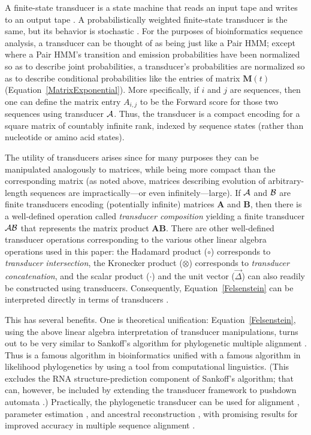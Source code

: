 \documentclass{bmcart}
\newcommand{\matr}[1]{\mathbf{#1}}
\newcommand{\trans}[1]{{\cal #1}}
\newcommand{\eqref}[1]{Equation~\ref{#1}}
\newcommand{\condmatrix}{\matr{M}}
\newcommand{\unitvec}{\vec{\Delta}}
\newcommand{\pointprod}{\circ}
\newcommand{\scalarprod}{\cdot}
\begin{document}
A finite-state transducer is a state machine that reads an input tape and writes to an output tape \cite{Mealy55}.
A probabilistically weighted finite-state transducer is the same, but its behavior is stochastic \cite{MohriPereiraRiley2000}.
For the purposes of bioinformatics sequence analysis,
a transducer can be thought of as being just like a Pair HMM;
except where a Pair HMM's transition and emission probabilities
have been normalized so as to describe joint probabilities,
a transducer's probabilities are normalized so as to describe conditional probabilities
like the entries of matrix $\condmatrix(t)$ (\eqref{MatrixExponential}).
More specifically, if $i$ and $j$ are sequences, then one can define the matrix entry $A_{i,j}$
to be the Forward score for those two sequences using transducer $\trans{A}$.
Thus, the transducer is a compact encoding for a square matrix of countably infinite rank,
indexed by sequence states (rather than nucleotide or amino acid states).

The utility of transducers arises since for many purposes they can be manipulated analogously to matrices,
while being more compact than the corresponding matrix (as noted above, matrices describing evolution of arbitrary-length sequences are impractically---or even infinitely---large).
If $\trans{A}$ and $\trans{B}$ are finite transducers encoding (potentially infinite) matrices $\matr{A}$ and $\matr{B}$,
then there is a well-defined operation called {\em transducer composition}
yielding a finite transducer $\trans{A}\trans{B}$ that represents the matrix product $\matr{A}\matr{B}$.
There are other well-defined transducer operations corresponding to the various other linear algebra
operations used in this paper:
the Hadamard product ($\pointprod$) corresponds to {\em transducer intersection},
the Kronecker product ($\otimes$) corresponds to {\em transducer concatenation},
and the scalar product ($\scalarprod$) and the unit vector ($\unitvec$) can also readily be constructed using transducers.
Consequently, \eqref{Felsenstein} can be interpreted directly
in terms of transducers \cite{WestessonEtAlArxiv2011,WestessonEtAl2012,BouchardCote2013}.

This has several benefits.
One is theoretical unification: \eqref{Felsenstein}, using the above
linear algebra interpretation of transducer manipulations,
turns out to be very similar to Sankoff's algorithm for phylogenetic multiple alignment \cite{Sankoff85}.
Thus is a famous algorithm in bioinformatics unified with a famous algorithm in likelihood phylogenetics
by using a tool from computational linguistics.
(This excludes the RNA structure-prediction component of Sankoff's algorithm;
that can, however, be included by extending the transducer
framework to pushdown automata \cite{BradleyHolmes2009}.)
Practically, the phylogenetic transducer can be used for alignment \cite{RedelingsSuchard2005,RedelingsSuchard2007},
parameter estimation \cite{Redelings2014}, and ancestral reconstruction \cite{WestessonEtAl2012},
with promising results for improved accuracy in multiple sequence alignment \cite{IndelHistorian}.
\end{document}
